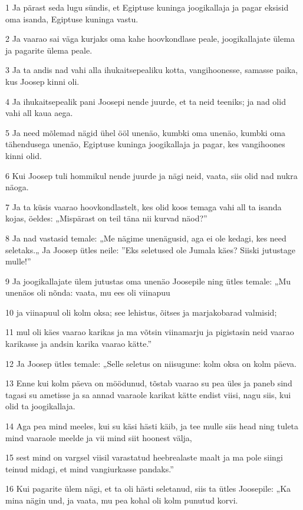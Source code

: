 \par 1 Ja pärast seda lugu sündis, et Egiptuse kuninga joogikallaja ja pagar eksisid oma isanda, Egiptuse kuninga vastu.
\par 2 Ja vaarao sai väga kurjaks oma kahe hoovkondlase peale, joogikallajate ülema ja pagarite ülema peale.
\par 3 Ja ta andis nad vahi alla ihukaitsepealiku kotta, vangihoonesse, samasse paika, kus Joosep kinni oli.
\par 4 Ja ihukaitsepealik pani Joosepi nende juurde, et ta neid teeniks; ja nad olid vahi all kaua aega.
\par 5 Ja need mõlemad nägid ühel ööl unenäo, kumbki oma unenäo, kumbki oma tähendusega unenäo, Egiptuse kuninga joogikallaja ja pagar, kes vangihoones kinni olid.
\par 6 Kui Joosep tuli hommikul nende juurde ja nägi neid, vaata, siis olid nad nukra näoga.
\par 7 Ja ta küsis vaarao hoovkondlastelt, kes olid koos temaga vahi all ta isanda kojas, öeldes: „Mispärast on teil täna nii kurvad näod?”
\par 8 Ja nad vastasid temale: „Me nägime unenägusid, aga ei ole kedagi, kes need seletaks.„ Ja Joosep ütles neile: ”Eks seletused ole Jumala käes? Siiski jutustage mulle!”
\par 9 Ja joogikallajate ülem jutustas oma unenäo Joosepile ning ütles temale: „Mu unenäos oli nõnda: vaata, mu ees oli viinapuu
\par 10 ja viinapuul oli kolm oksa; see lehistus, õitses ja marjakobarad valmisid;
\par 11 mul oli käes vaarao karikas ja ma võtsin viinamarju ja pigistasin neid vaarao karikasse ja andsin karika vaarao kätte.”
\par 12 Ja Joosep ütles temale: „Selle seletus on niisugune: kolm oksa on kolm päeva.
\par 13 Enne kui kolm päeva on möödunud, tõstab vaarao su pea üles ja paneb sind tagasi su ametisse ja sa annad vaaraole karikat kätte endist viisi, nagu siis, kui olid ta joogikallaja.
\par 14 Aga pea mind meeles, kui su käsi hästi käib, ja tee mulle siis head ning tuleta mind vaaraole meelde ja vii mind siit hoonest välja,
\par 15 sest mind on vargsel viisil varastatud heebrealaste maalt ja ma pole siingi teinud midagi, et mind vangiurkasse pandaks.”
\par 16 Kui pagarite ülem nägi, et ta oli hästi seletanud, siis ta ütles Joosepile: „Ka mina nägin und, ja vaata, mu pea kohal oli kolm punutud korvi.

